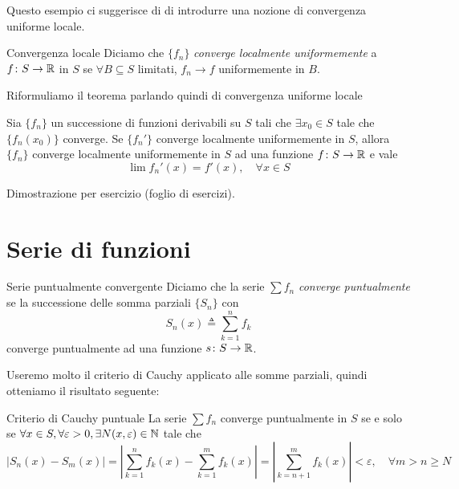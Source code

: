 \documentclass[a4paper]{article}
\begin{document}
Questo esempio ci suggerisce di di introdurre
una nozione di convergenza uniforme locale.

\begin{snippetdefinition}{Convergenza locale}
    Diciamo che \(\{f_n\}\)
    \emph{converge localmente uniformemente} a \(f \colon S \to \mathbb{R}\)
    in \(S\) se \(\forall B \subseteq S\) limitati, \(f_n \to f\) uniformemente in \(B\).
\end{snippetdefinition}

Riformuliamo il teorema parlando quindi di convergenza uniforme locale

\begin{snippettheorem}{}{}
    Sia \(\{f_n\}\) un successione di funzioni derivabili su \(S\)
    tali che \(\exists x_0 \in S\) tale che \(\{f_n(x_0)\}\) converge.
    Se \(\{f_n'\}\) converge localmente uniformemente in \(S\),
    allora \(\{f_n\}\) converge localmente uniformemente in \(S\) ad una funzione \(f\colon S \to \mathbb{R}\)
    e vale
    \[
        \lim f_n'(x) = f'(x), \quad \forall x \in S
    \]
\end{snippettheorem}

\begin{snippetproof}{}
    Dimostrazione per esercizio (foglio di esercizi).
\end{snippetproof}

\section{Serie di funzioni}

\begin{snippetdefinition}{Serie puntualmente convergente}
    Diciamo che la serie \(\sum f_n\) \emph{converge puntualmente}
    se la successione delle somma parziali \(\{S_n\}\) con
    \[
        S_n(x) \triangleq \sum_{k=1}^n f_k
    \]
    converge puntualmente ad una funzione \(s \colon S \to \mathbb{R}\).
\end{snippetdefinition}

Useremo molto il criterio di Cauchy
applicato alle somme parziali, quindi otteniamo il risultato seguente:

\begin{snippetproposition}{Criterio di Cauchy puntuale}
    La serie \(\sum f_n\) converge puntualmente in \(S\)
    se e solo se \(\forall x \in S, \forall \varepsilon > 0, \exists N(x, \varepsilon) \in \mathbb{N}\)
    tale che
    \[
        |S_n(x) - S_m(x)| = \left|
            \sum_{k=1}^n f_k(x) - \sum_{k=1}^m f_k(x)
        \right| = \left|
            \sum_{k=n+1}^m f_k(x)
        \right| < \varepsilon, \quad \forall m > n \geq N
    \]
\end{snippetproposition}
\end{document}
